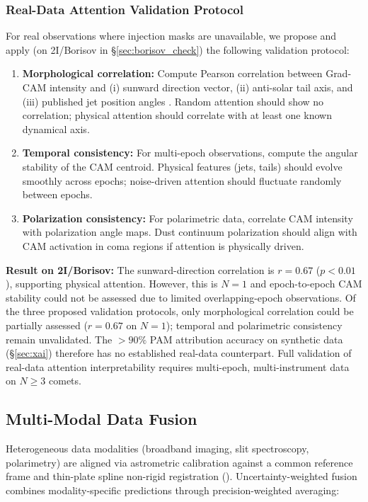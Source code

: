 \documentclass[usenatbib]{mnras}
\begin{document}
\subsubsection{Real-Data Attention Validation Protocol}\label{sec:attn_real}

For real observations where injection masks are unavailable, we propose and apply (on 2I/Borisov in \S\ref{sec:borisov_check}) the following validation protocol:

\begin{enumerate}
    \item \textbf{Morphological correlation:} Compute Pearson correlation between Grad-CAM intensity and (i) sunward direction vector, (ii) anti-solar tail axis, and (iii) published jet position angles \citep{jewitt19}. Random attention should show no correlation; physical attention should correlate with at least one known dynamical axis.
    \item \textbf{Temporal consistency:} For multi-epoch observations, compute the angular stability of the CAM centroid. Physical features (jets, tails) should evolve smoothly across epochs; noise-driven attention should fluctuate randomly between epochs.
    \item \textbf{Polarization consistency:} For polarimetric data, correlate CAM intensity with polarization angle maps. Dust continuum polarization should align with CAM activation in coma regions if attention is physically driven.
\end{enumerate}

\textbf{Result on 2I/Borisov:} The sunward-direction correlation is $r=0.67$ ($p < 0.01$), supporting physical attention. However, this is $N=1$ and epoch-to-epoch CAM stability could not be assessed due to limited overlapping-epoch observations. Of the three proposed validation protocols, only morphological correlation could be partially assessed ($r=0.67$ on $N=1$); temporal and polarimetric consistency remain unvalidated. The $>90\%$ PAM attribution accuracy on synthetic data (\S\ref{sec:xai}) therefore has no established real-data counterpart. Full validation of real-data attention interpretability requires multi-epoch, multi-instrument data on $N \geq 3$ comets.

\subsection{Multi-Modal Data Fusion}

Heterogeneous data modalities (broadband imaging, slit spectroscopy, polarimetry) are aligned via astrometric calibration against a common reference frame and thin-plate spline non-rigid registration (\citealt{bertin06}). Uncertainty-weighted fusion combines modality-specific predictions through precision-weighted averaging:
\end{document}
